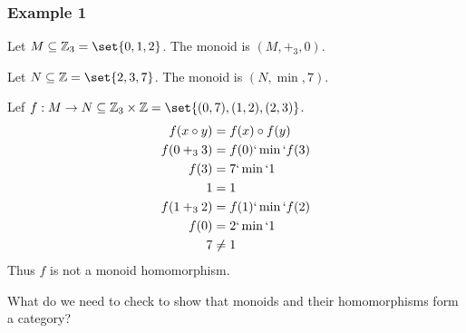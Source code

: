 \subsubsection{Example 1}
\begin{proofitem}
	\item Let $M\subseteq\mathbb{Z}_3=\set{0, 1, 2}$. The monoid is $(M, +_3, 0)$.
	\item Let $N\subseteq\mathbb{Z}=\set{2, 3, 7}$.
	The monoid is $(N, \min, 7)$.
	\item Lef $f: M \rightarrow N\subseteq \mathbb{Z}_3\times\mathbb{Z}=\set{(0, 7),
			(1, 2), (2, 3)}$.
	\begin{align*}
		f(x\circ y) & = f(x)\circ f(y)  \\
		f(0 +_3 3)  & = f(0)`\min` f(3) \\
		f(3)        & = 7`\min` 1       \\
		1           & = 1               \\
		f(1 +_3 2)  & = f(1)`\min` f(2) \\
		f(0)        & = 2`\min` 1       \\
		7           & \neq 1
	\end{align*}
	Thus $f$ is not a monoid homomorphism.
\end{proofitem}
\clearpage
\begin{ttta}
	What do we need to check to show that monoids and their homomorphisms form a
	category?
\end{ttta}

